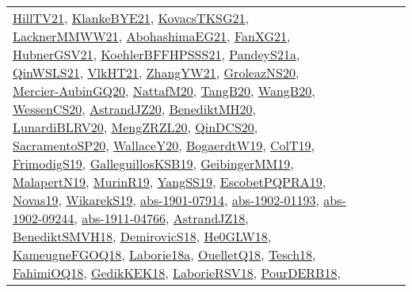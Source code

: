 {\begin{longtable}{llp{6cm}p{6cm}p{6cm}}
\href{papers/HillTV21.pdf}{HillTV21}\cite{HillTV21}, \href{papers/KlankeBYE21.pdf}{KlankeBYE21}\cite{KlankeBYE21}, \href{papers/KovacsTKSG21.pdf}{KovacsTKSG21}\cite{KovacsTKSG21}, \href{papers/LacknerMMWW21.pdf}{LacknerMMWW21}\cite{LacknerMMWW21}, \href{articles/AbohashimaEG21.pdf}{AbohashimaEG21}\cite{AbohashimaEG21}, \href{articles/FanXG21.pdf}{FanXG21}\cite{FanXG21}, \href{articles/HubnerGSV21.pdf}{HubnerGSV21}\cite{HubnerGSV21}, \href{articles/KoehlerBFFHPSSS21.pdf}{KoehlerBFFHPSSS21}\cite{KoehlerBFFHPSSS21}, \href{articles/PandeyS21a.pdf}{PandeyS21a}\cite{PandeyS21a}, \href{articles/QinWSLS21.pdf}{QinWSLS21}\cite{QinWSLS21}, \href{articles/VlkHT21.pdf}{VlkHT21}\cite{VlkHT21}, \href{articles/ZhangYW21.pdf}{ZhangYW21}\cite{ZhangYW21}, \href{papers/GroleazNS20.pdf}{GroleazNS20}\cite{GroleazNS20}, \href{papers/Mercier-AubinGQ20.pdf}{Mercier-AubinGQ20}\cite{Mercier-AubinGQ20}, \href{papers/NattafM20.pdf}{NattafM20}\cite{NattafM20}, \href{papers/TangB20.pdf}{TangB20}\cite{TangB20}, \href{papers/WangB20.pdf}{WangB20}\cite{WangB20}, \href{papers/WessenCS20.pdf}{WessenCS20}\cite{WessenCS20}, \href{articles/AstrandJZ20.pdf}{AstrandJZ20}\cite{AstrandJZ20}, \href{articles/BenediktMH20.pdf}{BenediktMH20}\cite{BenediktMH20}, \href{articles/LunardiBLRV20.pdf}{LunardiBLRV20}\cite{LunardiBLRV20}, \href{articles/MengZRZL20.pdf}{MengZRZL20}\cite{MengZRZL20}, \href{articles/QinDCS20.pdf}{QinDCS20}\cite{QinDCS20}, \href{articles/SacramentoSP20.pdf}{SacramentoSP20}\cite{SacramentoSP20}, \href{articles/WallaceY20.pdf}{WallaceY20}\cite{WallaceY20}, \href{papers/BogaerdtW19.pdf}{BogaerdtW19}\cite{BogaerdtW19}, \href{papers/ColT19.pdf}{ColT19}\cite{ColT19}, \href{papers/FrimodigS19.pdf}{FrimodigS19}\cite{FrimodigS19}, \href{papers/GalleguillosKSB19.pdf}{GalleguillosKSB19}\cite{GalleguillosKSB19}, \href{papers/GeibingerMM19.pdf}{GeibingerMM19}\cite{GeibingerMM19}, \href{papers/MalapertN19.pdf}{MalapertN19}\cite{MalapertN19}, \href{papers/MurinR19.pdf}{MurinR19}\cite{MurinR19}, \href{papers/YangSS19.pdf}{YangSS19}\cite{YangSS19}, \href{articles/EscobetPQPRA19.pdf}{EscobetPQPRA19}\cite{EscobetPQPRA19}, \href{articles/Novas19.pdf}{Novas19}\cite{Novas19}, \href{articles/WikarekS19.pdf}{WikarekS19}\cite{WikarekS19}, \href{articles/abs-1901-07914.pdf}{abs-1901-07914}\cite{abs-1901-07914}, \href{articles/abs-1902-01193.pdf}{abs-1902-01193}\cite{abs-1902-01193}, \href{articles/abs-1902-09244.pdf}{abs-1902-09244}\cite{abs-1902-09244}, \href{articles/abs-1911-04766.pdf}{abs-1911-04766}\cite{abs-1911-04766}, \href{papers/AstrandJZ18.pdf}{AstrandJZ18}\cite{AstrandJZ18}, \href{papers/BenediktSMVH18.pdf}{BenediktSMVH18}\cite{BenediktSMVH18}, \href{papers/DemirovicS18.pdf}{DemirovicS18}\cite{DemirovicS18}, \href{papers/He0GLW18.pdf}{He0GLW18}\cite{He0GLW18}, \href{papers/KameugneFGOQ18.pdf}{KameugneFGOQ18}\cite{KameugneFGOQ18}, \href{papers/Laborie18a.pdf}{Laborie18a}\cite{Laborie18a}, \href{papers/OuelletQ18.pdf}{OuelletQ18}\cite{OuelletQ18}, \href{papers/Tesch18.pdf}{Tesch18}\cite{Tesch18}, \href{articles/FahimiOQ18.pdf}{FahimiOQ18}\cite{FahimiOQ18}, \href{articles/GedikKEK18.pdf}{GedikKEK18}\cite{GedikKEK18}, \href{articles/LaborieRSV18.pdf}{LaborieRSV18}\cite{LaborieRSV18}, \href{articles/PourDERB18.pdf}{PourDERB18}\cite{PourDERB18}, 
\end{longtable}}
